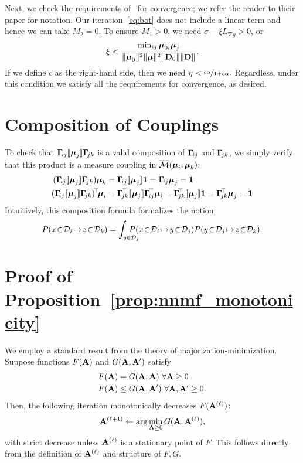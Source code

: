 Next, we check the requirements of~\cite[Lemma 5]{bot-2015} for convergence; we refer the reader to their paper for notation.  Our iteration~\eqref{eq:bot} does not include a linear term and hence we can take $M_2=0.$  To ensure $M_1>0$, we need $\sigma-\xi L_{\nabla g}>0$, or
$$\xi<\frac{\min_{ij} \boldsymbol{\mu}_{0i}\boldsymbol{\mu}_j}{\|\boldsymbol{\mu}_0\|^2 \|\boldsymbol{\mu}\|^2\|\mathbf D_0\|\|\mathbf D\|}.$$
If we define $c$ as the right-hand side, then we need $\eta<\nicefrac{c\alpha}{1+c\alpha}.$ Regardless, under this condition we satisfy all the requirements for convergence, as desired.

\section{Composition of Couplings}\label{sec:soft_map_composition}

To check that $\mathbf \Gamma\!_{ij}[\![\boldsymbol{\mu}_{j}]\!]\mathbf \Gamma\!_{jk}$ is a valid composition of $\mathbf \Gamma\!_{ij}$ and $\mathbf \Gamma\!_{jk}$,
we simply verify that this product is a measure coupling in $\overline{\mathcal M}(\boldsymbol{\mu}_i,\boldsymbol{\mu}_k)$:
\begin{align*}
(\G\!_{ij}\diag{\bmu_{j}}\G\!_{jk})\bmu_k
&=\G\!_{ij}\diag{\bmu_j}\1=\G\!_{ij}\bmu_j=\1\\
(\G\!_{ij}\diag{\bmu_{j}}\G\!_{jk})\!^\top\!\bmu_i
&=\G\!_{jk}^\top\diag{\bmu_j}\G\!_{ij}^\top\bmu_i
=\G\!_{jk}^\top\diag{\bmu_j}\1
=\G\!_{jk}^\top \bmu_j=\1
\end{align*}
Intuitively, this composition formula formalizes the notion $$P(x\!\in\!\mathcal D_i\!\mapsto\!z\!\in\!\mathcal D_k) = \int_{y\in\mathcal D_j}\hspace{-.2in}P(x\!\in\!\mathcal D_i\!\mapsto\!y\!\in\!\mathcal D_j)P(y\!\in\!\mathcal D_j\!\mapsto\!z\!\in\!\mathcal D_k).$$

\section{Proof of Proposition~\ref{prop:nnmf_monotonicity}}

We employ a standard result from the theory of majorization-minimization.  Suppose functions $F(\mathbf A)$ and $G(\mathbf A,\mathbf A')$ satisfy
\begin{align*}
F(\mathbf A) &=G(\mathbf A,\mathbf A)\ \forall \mathbf A\geq0\\
F(\mathbf A) &\leq G(\mathbf A,\mathbf A')\ \forall \mathbf A,\mathbf A'\geq0.
\end{align*}
Then, the following iteration monotonically decreases $F(\mathbf A^{(\ell)})$:
$$\mathbf A^{(\ell+1)}\gets\arg\min_{\mathbf A\geq0} G(\mathbf A,\mathbf A^{(\ell)}),$$
with strict decrease unless $\mathbf A^{(\ell)}$ is a stationary point of $F$.  This follows directly from the definition of $\mathbf A^{(\ell)}$ and structure of $F,G$.

